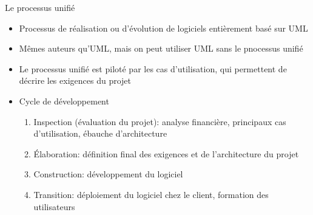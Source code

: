 \documentclass[14pt]{beamer}
\begin{document}
\begin{framentitle}{Le processus unifié}
    \begin{itemize}
        \item Processus de réalisation ou d'évolution de logiciels entièrement
            basé sur UML
        \item Mêmes auteurs qu'UML, mais on peut utiliser UML sans le pnocessus
            unifié
        \item Le processus unifié est piloté par les cas d'utilisation, qui
            permettent de décrire les exigences du projet
        \item Cycle de développement
            \begin{enumerate}
                \item Inspection (évaluation du projet): analyse financière,
                    principaux cas d'utilisation, ébauche d'architecture
                \item Élaboration: définition final des exigences et de
                    l'architecture du projet
                \item Construction: développement du logiciel
                \item Transition: déploiement du logiciel chez le client,
                    formation des utilisateurs
            \end{enumerate}
    \end{itemize}
\end{framentitle}
\end{document}
